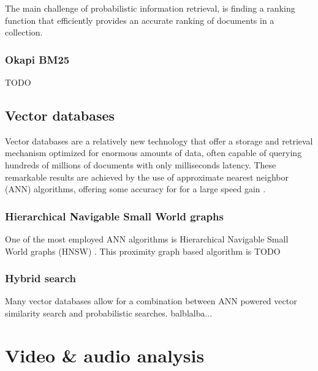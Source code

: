 \documentclass[twoside]{uva-inf-bachelor-thesis}
\begin{document}
 \cite{robertson1977probability}

The main challenge of probabilistic information retrieval, is finding a ranking function that efficiently provides an accurate ranking of documents in a collection. 

\subsubsection{Okapi BM25}
TODO


\subsection{Vector databases}
Vector databases are a relatively new technology that offer a storage and retrieval mechanism optimized for enormous amounts of data, often capable of querying hundreds of millions of documents with only milliseconds latency. 
These remarkable results are achieved by the use of approximate nearest neighbor (ANN) algorithms, offering some accuracy for for a large speed gain \cite{han2023comprehensive}. 

\subsubsection{Hierarchical Navigable Small World graphs}
One of the most employed ANN algorithms is Hierarchical Navigable Small World graphs (HNSW) \cite{malkov2018efficient}. This proximity graph based algorithm is TODO

\subsubsection{Hybrid search}
Many vector databases allow for a combination between ANN powered vector similarity search and probabilistic searches. balblalba...


\section{Video \& audio analysis}
\end{document}
